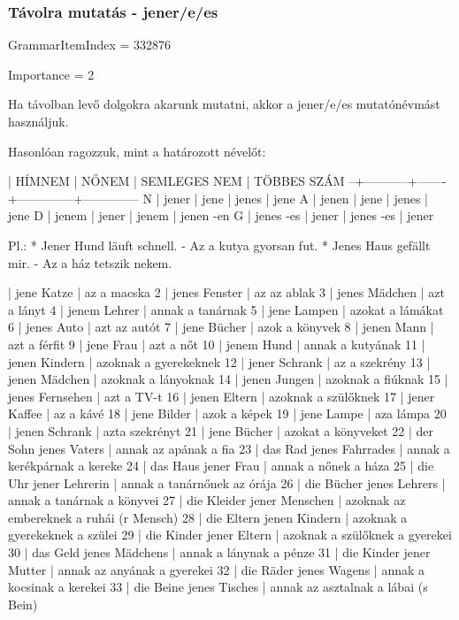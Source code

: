\documentclass{article}
\newenvironment{desc}{\verbatim}{\endverbatim}
\newenvironment{exmp}{\verbatim}{\endverbatim}
\begin{document}
\subsubsection{Távolra mutatás - jener/e/es}

GrammarItemIndex = 332876

Importance = 2

\begin{desc}
Ha távolban levő dolgokra akarunk mutatni, akkor a jener/e/es mutatónévmást használjuk.

Hasonlóan ragozzuk, mint a határozott névelőt:

  | HÍMNEM    | NŐNEM | SEMLEGES NEM | TÖBBES SZÁM
--+-----------+-------+--------------+--------------
N | jener     | jene  | jenes        | jene
A | jenen     | jene  | jenes        | jene
D | jenem     | jener | jenem        | jenen -en
G | jenes -es | jener | jenes -es    | jener

Pl.: * Jener Hund läuft schnell. - Az a kutya gyorsan fut.
* Jenes Haus gefällt mir. - Az a ház tetszik nekem.
\end{desc}

\begin{exmp}
1 | jene Katze | az a macska
2 | jenes Fenster | az az ablak
3 | jenes Mädchen | azt a lányt
4 | jenem Lehrer | annak a tanárnak
5 | jene Lampen | azokat a lámákat
6 | jenes Auto | azt az autót
7 | jene Bücher | azok a könyvek
8 | jenen Mann | azt a férfit
9 | jene Frau | azt a nőt
10 | jenem Hund | annak a kutyának
11 | jenen Kindern | azoknak a gyerekeknek
12 | jener Schrank | az a szekrény
13 | jenen Mädchen | azoknak a lányoknak
14 | jenen Jungen | azoknak  a fiúknak
15 | jenes Fernsehen | azt a TV-t
16 | jenen Eltern | azoknak a szülőknek
17 | jener Kaffee | az a kávé
18 | jene Bilder | azok a képek
19 | jene Lampe | aza lámpa
20 | jenen Schrank | azta szekrényt
21 | jene Bücher | azokat a könyveket
22 | der Sohn jenes Vaters | annak az apának a fia
23 | das Rad jenes Fahrrades | annak a kerékpárnak a kereke
24 | das Haus jener Frau | annak a nőnek a háza
25 | die Uhr jener Lehrerin | annak a tanárnőnek az órája
26 | die Bücher jenes Lehrers | annak a tanárnak a könyvei
27 | die Kleider jener Menschen | azoknak az embereknek a ruhái (r Mensch)
28 | die Eltern jenen Kindern | azoknak a gyerekeknek a szülei
29 | die Kinder jener Eltern | azoknak a szülőknek a gyerekei
30 | das Geld jenes Mädchens | annak a lánynak a pénze
31 | die Kinder jener Mutter | annak az anyának a gyerekei
32 | die Räder jenes Wagens | annak a kocsinak a kerekei
33 | die Beine jenes Tisches | annak az asztalnak a lábai (s Bein)
\end{exmp}
\end{document}
